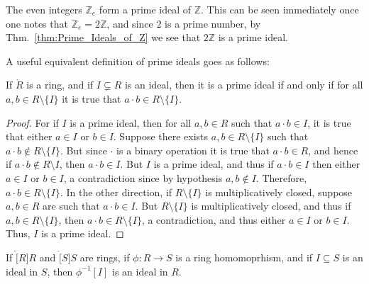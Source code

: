 \documentclass{article}                                                        %
\begin{document}
        \begin{example}
            The even integers $\mathbb{Z}_{e}$ form a prime ideal of
            $\mathbb{Z}$. This can be seen immediately once one notes that
            $\mathbb{Z}_{e}=2\mathbb{Z}$, and since $2$ is a prime number,
            by Thm.~\ref{thm:Prime_Ideals_of_Z} we see that $2\mathbb{Z}$ is a
            prime ideal.
        \end{example}
        A useful equivalent definition of prime ideals goes as follows:
        \begin{theorem}
            If $\ring{R}$ is a ring, and if $I\subsetneq{R}$ is an ideal, then
            it is a prime ideal if and only if for all $a,b\in{R}\setminus\{I\}$
            it is true that $a\cdot{b}\in{R}\setminus\{I\}$.
        \end{theorem}
        \begin{proof}
            For if $I$ is a prime ideal, then for all $a,b\in{R}$ such that
            $a\cdot{b}\in{I}$, it is true that either $a\in{I}$ or $b\in{I}$.
            Suppose there exists $a,b\in{R}\setminus\{I\}$ such that
            $a\cdot{b}\notin{R}\setminus\{I\}$. But since $\cdot$ is a binary
            operation it is true that $a\cdot{b}\in{R}$, and hence if
            $a\cdot{b}\notin{R}\setminus{I}$, then $a\cdot{b}\in{I}$. But $I$ is
            a prime ideal, and thus if $a\cdot{b}\in{I}$ then either $a\in{I}$
            or $b\in{I}$, a contradiction since by hypothesis $a,b\notin{I}$.
            Therefore, $a\cdot{b}\in{R}\setminus\{I\}$. In the other direction,
            if $R\setminus\{I\}$ is multiplicatively closed, suppose $a,b\in{R}$
            are such that $a\cdot{b}\in{I}$. But $R\setminus\{I\}$ is
            multiplicatively closed, and thus if $a,b\in{R}\setminus\{I\}$, then
            $a\cdot{b}\in{R}\setminus\{I\}$, a contradiction, and thus either
            $a\in{I}$ or $b\in{I}$. Thus, $I$ is a prime ideal.
        \end{proof}
        \begin{theorem}
            \label{thm:homo_pre_image_of_ideal_is_ideal}%
            If $\ring[R]{R}$ and $\ring[S]{S}$ are rings, if
            $\phi:R\rightarrow{S}$ is a ring homomoprhism, and if
            $I\subseteq{S}$ is an ideal in $S$, then $\phi^{\minus{1}}[I]$ is an
            ideal in $R$.
        \end{theorem}
\end{document}
